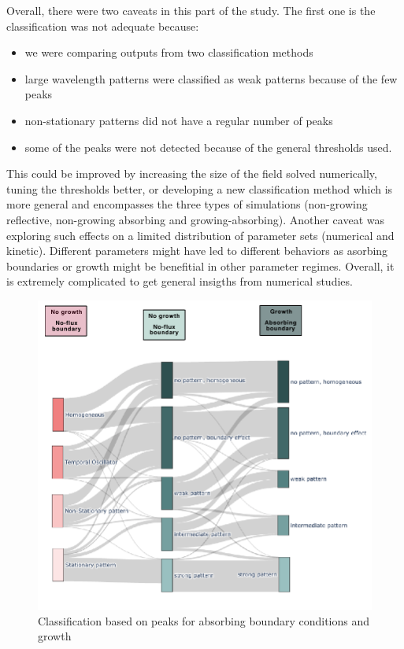 Overall, there were two caveats in this part of the study. The first one is the classification was not adequate because:
\begin{itemize}
    \item we were comparing outputs from two classification methods
    \item large wavelength patterns were classified as weak patterns because of the few peaks
    \item non-stationary patterns did not have a regular number of peaks
    \item some of the peaks were not detected because of the general thresholds used.

\end{itemize}
This could be improved by increasing the size of the field solved numerically, tuning the thresholds better, or developing a new classification method which is more general and encompasses the three types of simulations (non-growing reflective, non-growing absorbing and growing-absorbing).
Another caveat was exploring such effects on a limited distribution of parameter sets (numerical and kinetic).
Different parameters might have led to different behaviors as asorbing boundaries or growth might be benefitial in other parameter regimes.
Overall, it is extremely complicated to get general insigths from numerical studies.



\begin{figure}[H] %
    \centering
    \begin{adjustbox}{center}
        \includegraphics[width=1\textwidth]{chapters/Chapter 1/3layer_sankey} %
    \end{adjustbox}
    \caption{Classification based on peaks for absorbing boundary conditions and growth}
    \label{fig:3layer_sankey} %
\end{figure}








